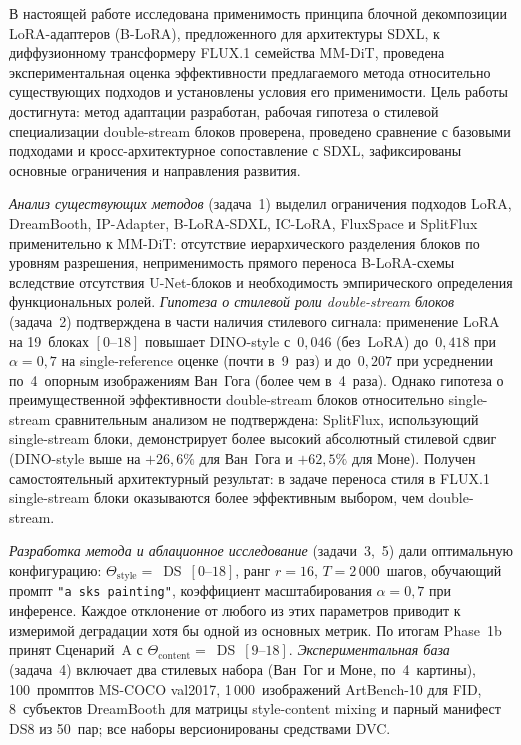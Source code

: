
В настоящей работе исследована применимость принципа блочной декомпозиции
LoRA-адаптеров (B-LoRA), предложенного для архитектуры SDXL, к диффузионному
трансформеру FLUX.1 семейства MM-DiT, проведена экспериментальная оценка
эффективности предлагаемого метода относительно существующих подходов и
установлены условия его применимости. Цель работы достигнута: метод адаптации
разработан, рабочая гипотеза о стилевой специализации double-stream блоков
проверена, проведено сравнение с базовыми подходами и кросс-архитектурное
сопоставление с SDXL, зафиксированы основные ограничения и направления развития.

\textit{Анализ существующих методов} (задача~1) выделил ограничения подходов
LoRA, DreamBooth, IP-Adapter, B-LoRA-SDXL, IC-LoRA, FluxSpace и SplitFlux
применительно к MM-DiT: отсутствие иерархического разделения блоков по уровням
разрешения, неприменимость прямого переноса B-LoRA-схемы вследствие отсутствия
U-Net-блоков и необходимость эмпирического определения функциональных ролей.
\textit{Гипотеза о стилевой роли double-stream блоков} (задача~2) подтверждена
в части наличия стилевого сигнала: применение LoRA на 19~блоках $[0\text{--}18]$
повышает DINO-style с~$0{,}046$ (без~LoRA) до~$0{,}418$ при $\alpha{=}0{,}7$
на single-reference оценке (почти в~9~раз) и до~$0{,}207$ при усреднении
по~4~опорным изображениям Ван~Гога (более чем в~4~раза). Однако гипотеза о
преимущественной эффективности double-stream блоков относительно
single-stream сравнительным анализом не подтверждена: SplitFlux,
использующий single-stream блоки, демонстрирует более высокий абсолютный
стилевой сдвиг
(DINO-style выше на $+26{,}6\%$ для Ван~Гога и $+62{,}5\%$ для Моне). Получен
самостоятельный архитектурный результат: в задаче переноса стиля в FLUX.1
single-stream блоки оказываются более эффективным выбором, чем double-stream.

\textit{Разработка метода и аблационное исследование} (задачи~3,~5) дали
оптимальную конфигурацию: $\Theta_\text{style}{=}$~DS~$[0\text{--}18]$, ранг $r{=}16$,
$T{=}2\,000$~шагов, обучающий промпт \texttt{"a sks painting"}, коэффициент
масштабирования $\alpha{=}0{,}7$ при инференсе. Каждое отклонение от любого
из этих параметров приводит к измеримой деградации хотя бы одной из основных
метрик. По итогам Phase~1b принят Сценарий~A с
$\Theta_\text{content}{=}$~DS~$[9\text{--}18]$.
\textit{Экспериментальная база} (задача~4) включает два стилевых набора
(Ван~Гог и Моне, по~4~картины), 100~промптов MS-COCO val2017, 1\,000~изображений
ArtBench-10 для FID, 8~субъектов DreamBooth для матрицы style-content mixing
и парный манифест DS8 из 50~пар; все наборы версионированы средствами DVC.

